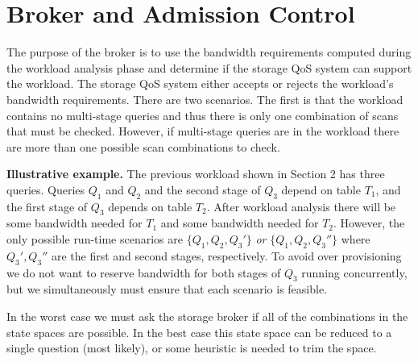 \documentclass{sig-alternate}
\begin{document}
\section{Broker and Admission Control}

The purpose of the broker is to use the bandwidth requirements computed during
the workload analysis phase and determine if the storage QoS system can
support the workload. The storage QoS system either accepts or rejects the
workload's bandwidth requirements. There are two scenarios. The first is that
the workload contains no multi-stage queries and thus there is only one
combination of scans that must be checked. However, if multi-stage queries are
in the workload there are more than one possible scan combinations to check.

{\bf Illustrative example.} The previous workload shown in Section 2 has three
queries. Queries $Q_1$ and $Q_2$ and the second stage of $Q_3$ depend on table
$T_1$, and the first stage of $Q_3$ depends on table $T_2$. After workload
analysis there will be some bandwidth needed for $T_1$ and some bandwidth
needed for $T_2$. However, the only possible run-time scenarios are $\{Q_1,
Q_2, Q_3'\}$ \emph{or} $\{Q_1, Q_2, Q_3''\}$ where $Q_3', Q_3''$ are the first
and second stages, respectively. To avoid over provisioning we do not want to
reserve bandwidth for both stages of $Q_3$ running concurrently, but we
simultaneously must ensure that each scenario is feasible.

In the worst case we must ask the storage broker if all of the combinations in
the state spaces are possible. In the best case this state space can be
reduced to a single question (most likely), or some heuristic is needed to
trim the space.



\end{document}
